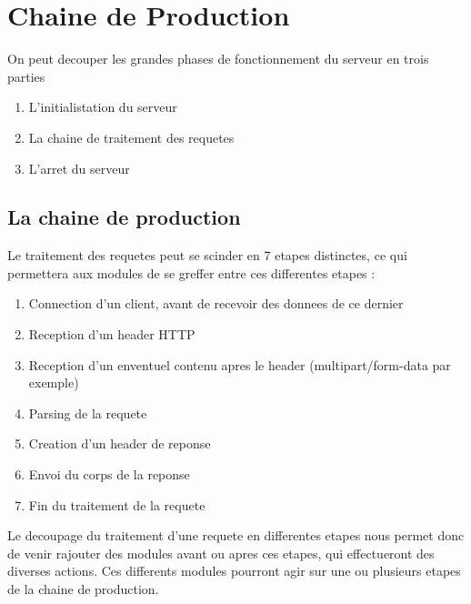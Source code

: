 \chapter{Chaine de Production}
On peut decouper les grandes phases de fonctionnement du serveur en trois parties

\begin{enumerate}
    \item L'initialistation du serveur
    \item La chaine de traitement des requetes
    \item L'arret du serveur
\end{enumerate}

\section{La chaine de production}
Le traitement des requetes peut se scinder en 7 etapes distinctes, 
ce qui permettera aux modules de se greffer entre ces differentes etapes :
        \begin{enumerate}
            \item Connection d'un client, avant de recevoir des donnees de ce dernier
            \item Reception d'un header HTTP
            \item Reception d'un enventuel contenu apres le header (multipart/form-data par exemple)
            \item Parsing de la requete
            \item Creation d'un header de reponse
            \item Envoi du corps de la reponse
            \item Fin du traitement de la requete
        \end{enumerate}

Le decoupage du traitement d'une requete en differentes etapes nous permet
donc de venir rajouter des modules avant ou apres ces etapes, qui 
effectueront des diverses actions. Ces differents modules pourront agir 
sur une ou plusieurs etapes de la chaine de production.
